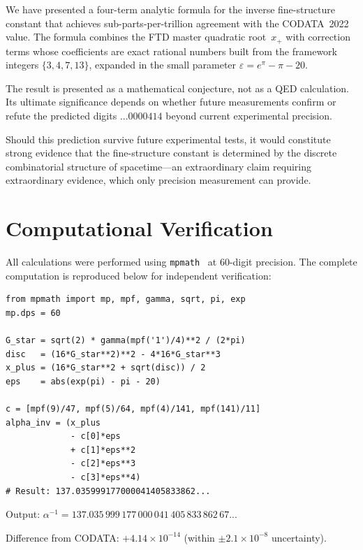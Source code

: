 \documentclass[11pt,twoside]{article}
\theoremstyle{remark}
\newcommand{\eps}{\varepsilon}
\newcommand{\xp}{x_{+}}
\newcommand{\inv}{\alpha^{-1}}
\begin{document}
We have presented a four-term analytic formula for the inverse fine-structure constant that achieves sub-parts-per-trillion agreement with the CODATA~2022 value.
The formula combines the FTD master quadratic root~$\xp$ with correction terms whose coefficients are exact rational numbers built from the framework integers $\{3, 4, 7, 13\}$, expanded in the small parameter $\eps = e^{\pi} - \pi - 20$.

The result is presented as a mathematical conjecture, not as a QED calculation.
Its ultimate significance depends on whether future measurements confirm or refute the predicted digits $...0000414$ beyond current experimental precision.

Should this prediction survive future experimental tests, it would constitute strong evidence that the fine-structure constant is determined by the discrete combinatorial structure of spacetime---an extraordinary claim requiring extraordinary evidence, which only precision measurement can provide.


\appendix

\section{Computational Verification}
\label{app:code}

All calculations were performed using \texttt{mpmath}~\cite{mpmath} at 60-digit precision.
The complete computation is reproduced below for independent verification:

\begin{verbatim}
from mpmath import mp, mpf, gamma, sqrt, pi, exp
mp.dps = 60

G_star = sqrt(2) * gamma(mpf('1')/4)**2 / (2*pi)
disc   = (16*G_star**2)**2 - 4*16*G_star**3
x_plus = (16*G_star**2 + sqrt(disc)) / 2
eps    = abs(exp(pi) - pi - 20)

c = [mpf(9)/47, mpf(5)/64, mpf(4)/141, mpf(141)/11]
alpha_inv = (x_plus
             - c[0]*eps
             + c[1]*eps**2
             - c[2]*eps**3
             - c[3]*eps**4)
# Result: 137.035999177000041405833862...
\end{verbatim}

\noindent Output: $\inv = 137.035\,999\,177\,000\,041\,405\,833\,862\,67...$

\vspace{0.3cm}
\noindent Difference from CODATA: $+4.14 \times 10^{-14}$ (within $\pm 2.1 \times 10^{-8}$ uncertainty).
\end{document}

